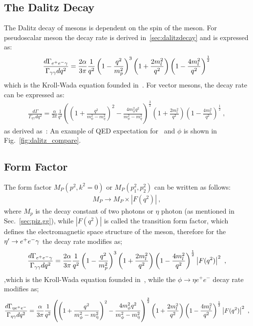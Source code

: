   \subsection{The Dalitz Decay}
  The Dalitz decay of mesons is dependent on the spin of the meson. For pseudoscalar meson the decay rate is derived in~\ref{sec:dalitzdecay} and is expressed as:
  \begin{align}\label{eq:eegff.finalkroll_II}
  \frac{d\Gamma_{e^+e^- \gamma}}{\Gamma_{\gamma\gamma} dq^2} = \frac{2 \alpha}{3 \pi} \frac{1}{q^2} \left( 1- \frac{q^2}{m_p^2}\right)^3 \left( 1+ \frac{2m_l^2}{q^2}\right) \left( 1- \frac{4m_l^2}{q^2}\right)^{\frac{1}{2}} 
  \end{align}
  which is the Kroll-Wada equation founded in~\cite{KrollWada,landsberg}. For vector mesons, the decay rate can be expressed as:
  \begin{align}
  \frac{d\Gamma}{\Gamma_{\eta\gamma} dq^2} = \frac{\alpha}{3 \pi} \frac{1}{q^2} \left( \left(1+ \frac{q^2}{m_{\phi}^2 - m_{\eta}^2} \right)^2 - \frac{4 m_{\phi}^2 q^2}{m_{\phi}^2 - m_{\eta}^2}\right)^\frac{3}{2} \left( 1+ \frac{2m_l^2}{q^2}\right) \left( 1- \frac{4m_l^2}{q^2}\right)^{\frac{1}{2}} \ ,
  \end{align}
  as derived as~\cite{landsberg}:
   An example of QED expectation for \etaTP  \ and $\phi$ is shown in Fig.~\ref{fig:dalitz_compare}.
  \subsection{Form Factor}
  The form factor ${M}_P(p^2,k^2=0)$ or ${M}_P(p_{1}^2,p_{2}^2)$  can be written as follows:
  \begin{align}
  {M}_P \to {M}_P \times \left|F(q^2)\right| \ ,
  \end{align}
  where $M_p$ is the decay constant of two photons or $\eta$ photon (as mentioned in Sec.~\ref{sec:piz.gg}), while $\left|F(q^2)\right|$ is called the transition form factor, which defines the electromagnetic space structure of the meson, therefore for the $\eta^{\prime} \to e^+e^- \gamma$ the decay rate modifies as;
  \begin{align}\label{eq:eegff.final}
  \frac{d\Gamma_{e^+e^- \gamma}}{\Gamma_{\gamma\gamma} dq^2} = \frac{2 \alpha}{3 \pi} \frac{1}{q^2} \left( 1- \frac{q^2}{m_p^2}\right)^3 \left( 1+ \frac{2m_l^2}{q^2}\right) \left( 1- \frac{4m_l^2}{q^2}\right)^{\frac{1}{2}} \left|F(q^2)\right|^2 \ ,
  \end{align}
  ,which is the Kroll-Wada equation founded in~\cite{KrollWada}, while the $\phi \to \eta e^+e^-$ decay rate modifies as;
  \begin{align}
  \frac{d\Gamma_{\eta e^+e^-}}{\Gamma_{\eta\gamma} dq^2} = \frac{\alpha}{3 \pi} \frac{1}{q^2} \left( \left(1+ \frac{q^2}{m_{\phi}^2 - m_{\eta}^2} \right)^2 - \frac{4 m_{\phi}^2 q^2}{m_{\phi}^2 - m_{\eta}^2}\right)^\frac{3}{2} \left( 1+ \frac{2m_l^2}{q^2}\right) \left( 1- \frac{4m_l^2}{q^2}\right)^{\frac{1}{2}} \left|F(q^2)\right|^2 \ ,
  \end{align}
  
